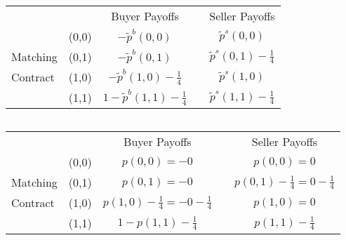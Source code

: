 \documentclass[12pt,letterpaper]{article}           %
\begin{document}


\begin{table}[]
	\begin{tabular}{lcccc}
		&                            & Buyer Payoffs         &                       & Seller Payoffs        \\ \cline{3-3} \cline{5-5} 
		& \multicolumn{1}{c|}{(0,0)} & \multicolumn{1}{c|}{$ -\tilde{p}^b(0,0)$} & \multicolumn{1}{c|}{} & \multicolumn{1}{c|}{$ \tilde{p}^s(0,0)$} \\ \cline{3-3} \cline{5-5} 
		Matching & \multicolumn{1}{c|}{(0,1)} & \multicolumn{1}{c|}{$ -\tilde{p}^b(0,1)$} & \multicolumn{1}{c|}{} & \multicolumn{1}{c|}{$ \tilde{p}^s(0,1) -\frac{1}{4}$}  \\ \cline{3-3} \cline{5-5} 
		Contract& \multicolumn{1}{c|}{(1,0)} & \multicolumn{1}{c|}{$ -\tilde{p}^b(1,0) - \frac{1}{4}$} & \multicolumn{1}{c|}{} & \multicolumn{1}{c|}{$ \tilde{p}^s(1,0)$} \\ \cline{3-3} \cline{5-5} 
		& \multicolumn{1}{c|}{(1,1)} & \multicolumn{1}{c|}{$ 1- \tilde{p}^b(1,1) - \frac{1}{4}$} & \multicolumn{1}{c|}{} & \multicolumn{1}{c|}{$ \tilde{p}^s(1,1)- \frac{1}{4}$} \\ \cline{3-3} \cline{5-5} 
	\end{tabular}
\end{table}

$ $

\newpage


\begin{table}[]
	\begin{tabular}{lcccc}
		&                            & Buyer Payoffs         &                       & Seller Payoffs        \\ \cline{3-3} \cline{5-5} 
		& \multicolumn{1}{c|}{(0,0)} & \multicolumn{1}{c|}{$p(0,0)= -0$} & \multicolumn{1}{c|}{} & \multicolumn{1}{c|}{$p(0,0)=  0$} \\ \cline{3-3} \cline{5-5} 
		Matching & \multicolumn{1}{c|}{(0,1)} & \multicolumn{1}{c|}{$p(0,1)= -0$} & \multicolumn{1}{c|}{} & \multicolumn{1}{c|}{$p(0,1) -\frac{1}{4}= 0 -\frac{1}{4}$}  \\ \cline{3-3} \cline{5-5} 
		Contract& \multicolumn{1}{c|}{(1,0)} & \multicolumn{1}{c|}{$ p(1,0) - \frac{1}{4}= - 0 - \frac{1}{4}$} & \multicolumn{1}{c|}{} & \multicolumn{1}{c|}{$p(1,0)=  0$} \\ \cline{3-3} \cline{5-5} 
		& \multicolumn{1}{c|}{(1,1)} & \multicolumn{1}{c|}{$ 1-p(1,1) - \frac{1}{4}$} & \multicolumn{1}{c|}{} & \multicolumn{1}{c|}{$ p(1,1)- \frac{1}{4}$} \\ \cline{3-3} \cline{5-5} 
	\end{tabular}
\end{table}
\end{document}
